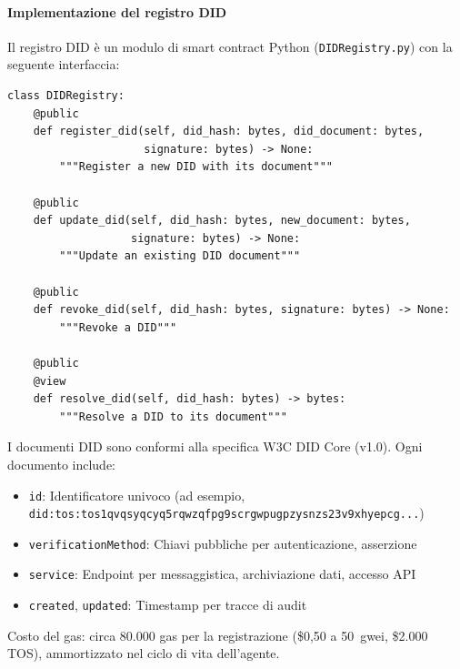 \documentclass[11pt]{article}
\begin{document}
\paragraph{Implementazione del registro DID} Il registro DID è un modulo di smart contract Python (\texttt{DIDRegistry.py}) con la seguente interfaccia:
\begin{verbatim}
class DIDRegistry:
    @public
    def register_did(self, did_hash: bytes, did_document: bytes,
                     signature: bytes) -> None:
        """Register a new DID with its document"""

    @public
    def update_did(self, did_hash: bytes, new_document: bytes,
                   signature: bytes) -> None:
        """Update an existing DID document"""

    @public
    def revoke_did(self, did_hash: bytes, signature: bytes) -> None:
        """Revoke a DID"""

    @public
    @view
    def resolve_did(self, did_hash: bytes) -> bytes:
        """Resolve a DID to its document"""
\end{verbatim}
I documenti DID sono conformi alla specifica W3C DID Core (v1.0). Ogni documento include:
\begin{itemize}[noitemsep]
  \item \texttt{id}: Identificatore univoco (ad esempio, \texttt{did:tos:tos1qvqsyqcyq5rqwzqfpg9scrgwpugpzysnzs23v9xhyepcg...})
  \item \texttt{verificationMethod}: Chiavi pubbliche per autenticazione, asserzione
  \item \texttt{service}: Endpoint per messaggistica, archiviazione dati, accesso API
  \item \texttt{created}, \texttt{updated}: Timestamp per tracce di audit
\end{itemize}
Costo del gas: circa 80.000 gas per la registrazione (\$0,50 a 50~gwei, \$2.000 TOS), ammortizzato nel ciclo di vita dell'agente.
\end{document}
